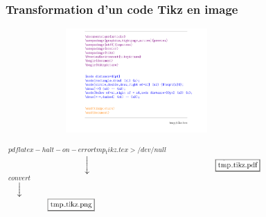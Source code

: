 \documentclass{beamer}
\begin{document}
\begin{frame}
\frametitle{Transformation d'un code Tikz en image}
\includegraphics[width=10cm, height=4cm]{img/c1.png} \\
\begin{center}
$\overset{pdflatex -halt-on-error tmp_tikz.tex > /dev/null}{\downarrow}$
\includegraphics[width=5cm, height=0.5cm]{img/re1.png} \\
$\overset{convert}{\downarrow}$ \\
\includegraphics[width=5cm, height=0.5cm]{img/re2.png} \\
\end{center}

\end{frame}
\end{document}
